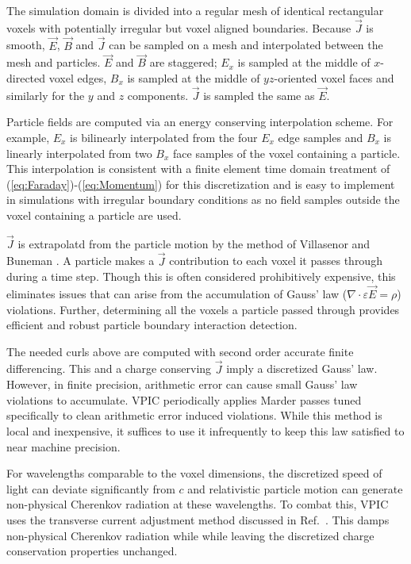 \documentclass[10pt]{article}
\newcommand{\eps}{\varepsilon}
\newcommand{\vecJ}{\vec{J}}
\newcommand{\vecE}{\vec{E}}
\newcommand{\vecB}{\vec{B}}
\newcommand{\Div}[1]{\nabla \cdot #1}
\newcommand{\eq}[1]{(\ref{eq:#1})}
\begin{document}
The simulation domain is divided into a regular mesh of identical
rectangular voxels with potentially irregular but voxel aligned
boundaries.  Because $\vecJ$ is smooth, $\vecE$, $\vecB$ and $\vecJ$
can be sampled on a mesh and interpolated between the mesh and
particles.  $\vecE$ and $\vecB$ are staggered; $E_x$ is sampled at
the middle of $x$-directed voxel edges, $B_x$ is sampled at the middle
of $yz$-oriented voxel faces and similarly for the $y$ and $z$
components.  $\vecJ$ is sampled the same as $\vecE$.

Particle fields are computed via an energy conserving interpolation
scheme.  For example, $E_x$ is bilinearly interpolated from the four
$E_x$ edge samples and $B_x$ is linearly interpolated from two $B_x$
face samples of the voxel containing a particle.  This interpolation
is consistent with a finite element time domain treatment of
\eq{Faraday}-\eq{Momentum} for this discretization
\cite{Eastwood_et_al_1995} and is easy to implement in simulations
with irregular boundary conditions as no field samples outside the
voxel containing a particle are used.

$\vecJ$ is extrapolatd from the particle motion by the method of
Villasenor and Buneman \cite{Villasenor_Buneman_1992}.  A particle
makes a $\vecJ$ contribution to each voxel it passes through during a
time step.  Though this is often considered prohibitively expensive,
this eliminates issues that can arise from the accumulation of Gauss'
law ($\Div{\eps\vecE}=\rho$) violations.  Further, determining all the
voxels a particle passed through provides efficient and robust
particle boundary interaction detection.

The needed curls above are computed with second order accurate finite
differencing.  This and a charge conserving $\vecJ$ imply a
discretized Gauss' law.  However, in finite precision, arithmetic
error can cause small Gauss' law violations to accumulate.  VPIC
periodically applies Marder passes \cite{Marder_1987} tuned
specifically to clean arithmetic error induced violations.  While this
method is local and inexpensive, it suffices to use it infrequently to
keep this law satisfied to near machine precision.

For wavelengths comparable to the voxel dimensions, the discretized
speed of light can deviate significantly from $c$ and relativistic
particle motion can generate non-physical Cherenkov radiation at these
wavelengths.  To combat this, VPIC uses the transverse current
adjustment method discussed in Ref.~\cite{Eastwood_et_al_1995}.  This
damps non-physical Cherenkov radiation while while leaving the
discretized charge conservation properties unchanged.
\end{document}
